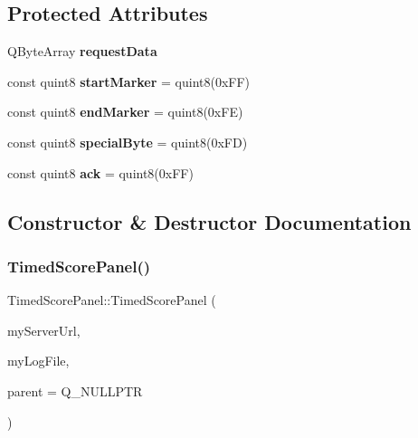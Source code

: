 \subsection*{Protected Attributes}
\begin{DoxyCompactItemize}
\item 
\mbox{\label{classTimedScorePanel_ab709153aa0a1ea23d2209c359b3adfe0}} 
Q\+Byte\+Array {\bfseries request\+Data}
\item 
\mbox{\label{classTimedScorePanel_ad6785d83eabd109d61604d1893703b25}} 
const quint8 {\bfseries start\+Marker} = quint8(0x\+F\+F)
\item 
\mbox{\label{classTimedScorePanel_a1233e5ee97ca72e98b37c5fc81a2a94d}} 
const quint8 {\bfseries end\+Marker} = quint8(0x\+F\+E)
\item 
\mbox{\label{classTimedScorePanel_a59e028723640161364bf730557737b54}} 
const quint8 {\bfseries special\+Byte} = quint8(0x\+F\+D)
\item 
\mbox{\label{classTimedScorePanel_a58f99170c990833d0fd52e33015a1da1}} 
const quint8 {\bfseries ack} = quint8(0x\+F\+F)
\end{DoxyCompactItemize}


\subsection{Constructor \& Destructor Documentation}
\mbox{\label{classTimedScorePanel_ac8b702def5462d859d6aa9d430d3aa86}} 
\subsubsection{\texorpdfstring{Timed\+Score\+Panel()}{TimedScorePanel()}}
{\footnotesize\ttfamily Timed\+Score\+Panel\+::\+Timed\+Score\+Panel (\begin{DoxyParamCaption}\item[{Q\+String}]{my\+Server\+Url,  }\item[{Q\+File $\ast$}]{my\+Log\+File,  }\item[{Q\+Widget $\ast$}]{parent = {\ttfamily Q\+\_\+NULLPTR} }\end{DoxyParamCaption})}



